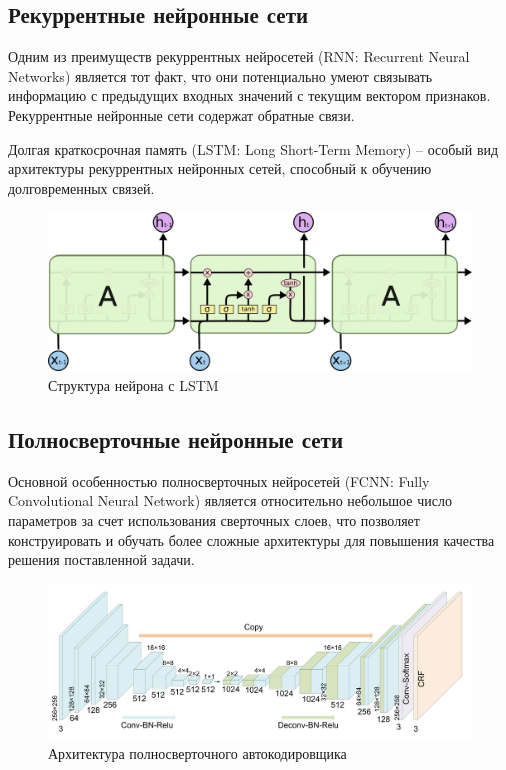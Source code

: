 \documentclass[12pt]{article}
\begin{document}
    \subsection{Рекуррентные нейронные сети}
    \label{sec:Future:LSTM}

    \par Одним из преимуществ рекуррентных нейросетей (RNN: Recurrent Neural Networks) \cite{RNN} является тот факт, что они потенциально умеют связывать информацию с предыдущих входных значений с текущим вектором признаков. Рекуррентные нейронные сети содержат обратные связи.

    \par Долгая краткосрочная память (LSTM: Long Short-Term Memory) \cite{LSTM} – особый вид архитектуры рекуррентных нейронных сетей, способный к обучению долговременных связей.

    \begin{figure}[h!]
        \centering
        \includegraphics[width=0.9\linewidth]{LSTM.png}
        \caption{Структура нейрона с LSTM}
        \label{sec:Future:LSTM:fig:LSTM}
    \end{figure}


    \subsection{Полносверточные нейронные сети}
    \label{sec:Future:FCNN}

    \par Основной особенностью полносверточных нейросетей \cite{FCNN} (FCNN: Fully Convolutional Neural Network) является относительно небольшое число параметров за счет использования сверточных слоев, что позволяет конструировать и обучать более сложные архитектуры для повышения качества решения поставленной задачи.

    \begin{figure}[h!]
        \centering
        \includegraphics[width=0.9\linewidth]{FCNN.png}
        \caption{Архитектура полносверточного автокодировщика}
        \label{sec:Future:FCNN:fig:FCNN}
    \end{figure}
\end{document}
